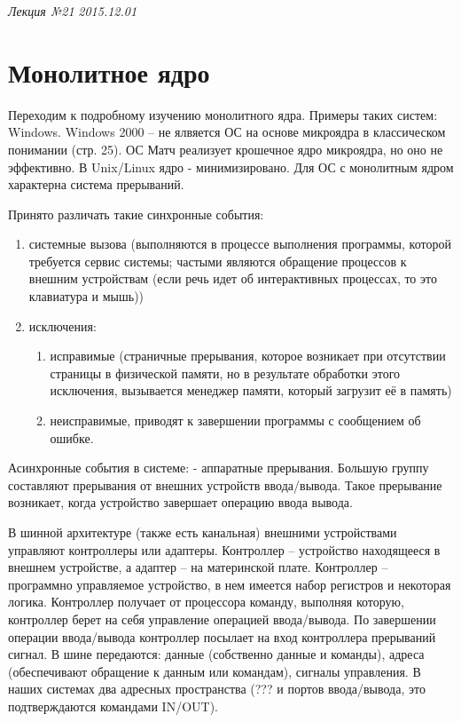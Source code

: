 \clearpage
\begin{flushright}
    \textit{Лекция №21}
    \textit{2015.12.01}
\end{flushright}

\section{Монолитное ядро}

Переходим к подробному изучению монолитного ядра.
Примеры таких систем: Windows. Windows 2000 – не ялвяется ОС на основе микроядра в классическом понимании (стр. 25).
ОС Матч реализует крошечное ядро микроядра, но оно не эффективно. 
В Unix/Linux ядро - минимизировано.
Для ОС с монолитным ядром характерна система прерываний. 

Принято различать такие синхронные события:
\begin{enumerate}
    \item системные вызова (выполняются в процессе выполнения программы, которой требуется сервис системы; частыми являются обращение процессов к внешним устройствам (если речь идет об интерактивных процессах, то это клавиатура и мышь))
    \item исключения:
    \begin{enumerate}
    	\item  исправимые (страничные прерывания, которое возникает при отсутствии страницы в физической памяти, но в результате обработки этого исключения, вызывается менеджер памяти, который загрузит её в память)
    	\item  неисправимые, приводят к завершении программы с сообщением об ошибке.
	\end{enumerate} 
\end{enumerate} 

Асинхронные события в системе:
- аппаратные прерывания. Большую группу составляют прерывания от внешних устройств ввода/вывода. Такое прерывание возникает, когда устройство завершает операцию ввода вывода.

В шинной архитектуре (также есть канальная) внешними устройствами управляют контроллеры или адаптеры. Контроллер – устройство находящееся в внешнем устройстве, а адаптер – на материнской плате. 
Контроллер – программно управляемое устройство, в нем имеется набор регистров и некоторая логика. Контроллер получает от процессора команду, выполняя которую, контроллер берет на себя управление операцией ввода/вывода. По завершении операции ввода/вывода контроллер посылает на вход контроллера прерываний сигнал.
В шине передаются: данные (собственно данные и команды), адреса (обеспечивают обращение к данным или командам), сигналы управления. В наших системах два адресных пространства (??? и портов ввода/вывода, это подтверждаются командами IN/OUT).

